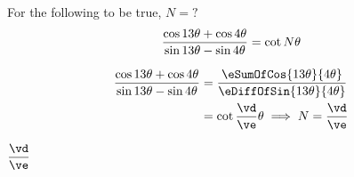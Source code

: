 

\SUBTRACT\va\vb\vc
\FRACTIONSIMPLIFY{}\vd\ve

\question[1] For the following to be true, $N=?$
  \[ \dfrac{\cos13\theta + \cos4\theta}{\sin13\theta - \sin4\theta} = \cot N\theta \]

\watchout

\begin{solution}[\mcq]
	\begin{align}
    \dfrac{\cos\va\theta + \cos\vb\theta}{\sin\va\theta - \sin\vb\theta} &= 
    \dfrac{\eSumOfCos{\va\theta}{\vb\theta}}{\eDiffOfSin{\va\theta}{\vb\theta}} \\
    &= \cot\dfrac\vd\ve\theta\implies N=\dfrac\vd\ve
	\end{align}
\end{solution}
\ifprintanswers\begin{codex}$\dfrac\vd\ve$\end{codex}\fi
